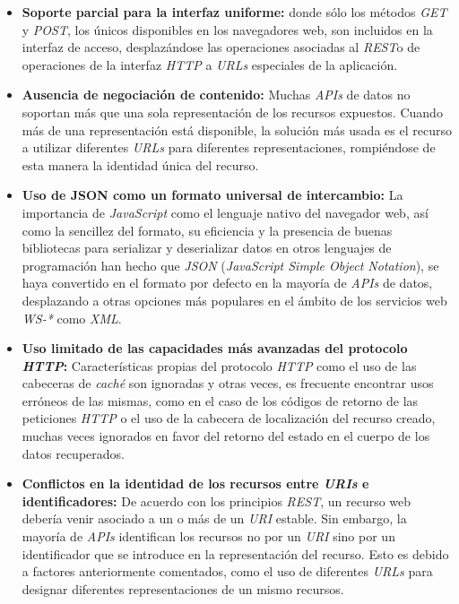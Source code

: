 \begin{itemize}

\item \textbf{Soporte parcial para la interfaz uniforme:} donde s\'olo los m\'etodos \textit{GET} y \textit{POST}, los \'unicos disponibles en los navegadores web, son incluidos en la interfaz de acceso, desplaz\'andose las operaciones asociadas al \textit{REST}o de operaciones de la interfaz \textit{HTTP} a \textit{URLs} especiales de la aplicaci\'on.

\item \textbf{Ausencia de negociaci\'on de contenido:} Muchas \textit{APIs} de datos no soportan m\'as que una sola representaci\'on de los recursos expuestos. Cuando m\'as de una representaci\'on est\'a disponible, la soluci\'on m\'as usada es el recurso a utilizar diferentes \textit{URLs} para diferentes representaciones, rompi\'endose de esta manera la identidad \'unica del recurso.

\item \textbf{Uso de JSON como un formato universal de intercambio:} La importancia de \textit{JavaScript} como el lenguaje nativo del navegador web, as\'i como la sencillez del formato, su eficiencia y la presencia de buenas bibliotecas para serializar y deserializar datos en otros lenguajes de programaci\'on han hecho que \textit{JSON} (\textit{JavaScript Simple Object Notation}), se haya convertido en el formato por defecto en la mayor\'ia de \textit{APIs} de datos, desplazando a otras opciones m\'as populares en el \'ambito de los servicios web \textit{WS-*} como \textit{XML}.

\item \textbf{Uso limitado de las capacidades m\'as avanzadas del protocolo \textit{HTTP}:} Caracter\'isticas propias del protocolo \textit{HTTP} como el uso de las cabeceras de \textit{cach\'e} son ignoradas y otras veces, es frecuente encontrar usos err\'oneos de las mismas, como en el caso de los c\'odigos de retorno de las peticiones \textit{HTTP} o el uso de la cabecera de localizaci\'on del recurso creado, muchas veces ignorados en favor del retorno del estado en el cuerpo de los datos recuperados.

\item \textbf{Conflictos en la identidad de los recursos entre \textit{URIs} e identificadores:} De acuerdo con los principios \textit{REST}, un recurso web deber\'ia venir asociado a un o m\'as de un \textit{URI} estable. Sin embargo, la mayor\'ia de \textit{APIs} identifican los recursos no por un \textit{URI} sino por un identificador que se introduce en la representaci\'on del recurso. Esto es debido a factores anteriormente comentados, como el uso de diferentes \textit{URLs} para designar diferentes representaciones de un mismo recursos.


\end{itemize}
